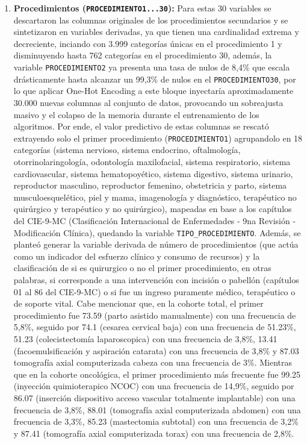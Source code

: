 \begin{enumerate}
    \item \textbf{Procedimientos (\texttt{PROCEDIMIENTO1...30}):} Para estas 30 variables se descartaron las columnas originales de los procedimientos secundarios y se sintetizaron en variables derivadas, ya que tienen una cardinalidad extrema y decreciente, inciando con 3.999 categorías únicas en el procedimiento 1 y disminuyendo hasta 762 categorías en el procedimiento 30, además, la variable \texttt{PROCEDIMIENTO2} ya presenta una tasa de nulos de 8,4\% que escala drásticamente hasta alcanzar un 99,3\% de nulos en el \texttt{PROCEDIMIENTO30}, por lo que aplicar One-Hot Encoding a este bloque inyectaría aproximadamente 30.000 nuevas columnas al conjunto de datos, provocando un sobreajusta masivo y el colapso de la memoria durante el entrenamiento de los algoritmos. Por ende, el valor predictivo de estas columnas se rescató extrayendo solo el primer procedimiento (\texttt{PROCEDIMIENTO1}) agrupandolo en 18 categorías (sistema nervioso, sistema endocrino, oftalmología, otorrinolaringología, odontología maxilofacial, sistema respiratorio, sistema cardiovascular, sistema hematopoyético, sistema digestivo, sistema urinario, reproductor masculino, reproductor femenino, obstetricia y parto, sistema musculoesquelético, piel y mama, imagenología y diagnóstico, terapéutico no quirúrgico y terapéutico y no quirúrgico), mapeadas en base a los capítulos del CIE-9-MC (Clasificación Internacional de Enfermedades - 9na Revisión - Modificación Clínica), quedando la variable \texttt{TIPO\_PROCEDIMIENTO}. Además, se planteó generar la variable derivada de número de procedimientos (que actúa como un indicador del esfuerzo clínico y consumo de recursos) y la clasificación de si es quirurgico o no el primer procedimiento, en otras palabras, si corresponde a una intervención con incisión o pabellón (capítulos 01 al 86 del CIE-9-MC) o si fue un ingreso puramente médico, terapéutico o de soporte vital. Cabe mencionar que, en la cohorte total, el primer procedimiento fue 73.59 (parto asistido manualmente) con una frecuencia de 5,8\%, seguido por 74.1 (cesarea cervical baja) con una frecuencia de 51.23\%, 51.23 (colecistectomía laparoscopica) con una frecuencia de 3,8\%, 13.41 (facoemulsificación y aspiración catarata) con una frecuencia de 3,8\% y 87.03 tomografía axial computerizada cabeza con una frecuencia de 3\%. Mientras que en la cohorte oncológica, el primer procedimiento más frecuente fue 99.25 (inyección quimioterapico NCOC) con una frecuencia de 14,9\%, seguido por 86.07 (inserción dispositivo acceso vascular totalmente implantable) con una frecuencia de 3,8\%, 88.01 (tomografía axial computerizada abdomen) con una frecuencia de 3,3\%, 85.23 (mastectomia subtotal) con una frecuencia de 3,2\% y 87.41 (tomografía axial computerizada torax) con una frecuencia de 2,8\%.

\end{enumerate}
